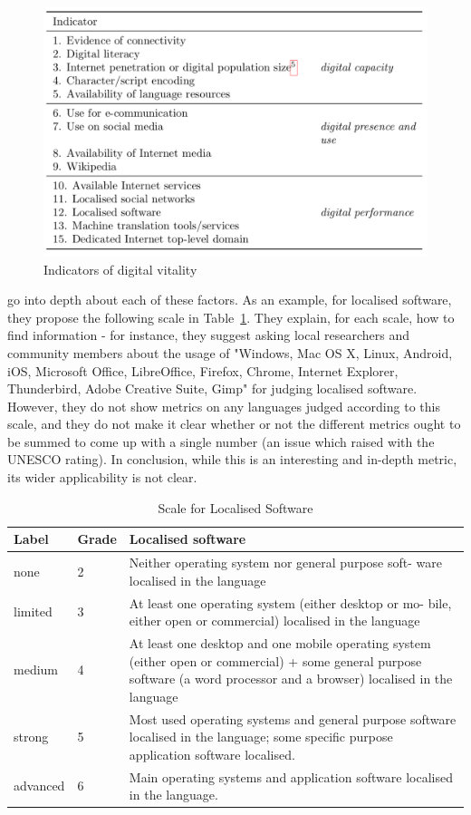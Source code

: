 \begin{figure}
 \centering
 \includegraphics[width=.8\textwidth]{img/dldp.png}
 \caption{Indicators of digital vitality \citep[6]{soria2017digital}}
 \label{fig:dldp}
\end{figure}

\citet{soria2017digital} go into depth about each of these factors. As an example, for localised software, they propose the following scale in Table~\ref{table:dldp-software}. They explain, for each scale, how to find information - for instance, they suggest asking local researchers and community members about the usage of "Windows, Mac OS X, Linux, Android, iOS, Microsoft Office, LibreOffice, Firefox, Chrome, Internet Explorer, Thunderbird, Adobe Creative Suite, Gimp" for judging localised software. However, they do not show metrics on any languages judged according to this scale, and they do not make it clear whether or not the different metrics ought to be summed to come up with a single number (an issue which \citet{lee2016assessing} raised with the UNESCO rating). In conclusion, while this is an interesting and in-depth metric, its wider applicability is not clear.

\begin{table}
\begin{center}
\begin{tabular}{|p{2cm}|p{1.5cm}|p{9.5cm}|} \hline
Label & Grade & Localised software \\ \hline
none & 2 & Neither operating system nor general purpose soft- ware localised in the language\\ \hline
limited & 3 & At least one operating system (either desktop or mo- bile, either open or commercial) localised in the language \\ \hline
medium & 4 & At least one desktop and one mobile operating system (either open or commercial) + some general purpose software (a word processor and a browser) localised in the language\\ \hline
strong & 5 & Most used operating systems and general purpose software localised in the language; some specific purpose application software localised.\\ \hline
advanced & 6 & Main operating systems and application software localised in the language.  \\ \hline
\end{tabular}
\end{center}
\caption{Scale for Localised Software \citep[21]{soria2017digital}}
\label{table:dldp-software}
\end{table}

